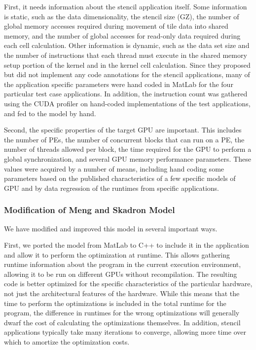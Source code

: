 \documentclass{sig-alternate}
\begin{document}
First, it needs information about the stencil application itself.  Some
information is static, such as the data dimensionality, the stencil size
(GZ), the number of global memory accesses required during movement of tile
data into shared memory, and the number of global accesses for read-only data
required during each cell calculation.  Other information is dynamic, such as
the data set size and the number of instructions that each thread must
execute in the shared memory setup portion of the kernel and in the kernel
cell calculation.  Since they proposed but did not implement any code
annotations for the stencil applications, many of the application specific
parameters were hand coded in MatLab for the four particular test case
applications.  In addition, the instruction count was gathered using the CUDA
profiler on hand-coded implementations of the test applications, and fed to
the model by hand.

Second, the specific properties of the target GPU are important.  This
includes the number of PEs, the number of concurrent blocks that can run on a
PE, the number of threads allowed per block, the time required for the GPU to
perform a global synchronization, and several GPU memory performance
parameters.  These values were acquired by a number of means, including hand
coding some parameters based on the published characteristics of a few
specific models of GPU and by data regression of the runtimes from specific
applications.

\subsubsection{Modification of Meng and Skadron Model}

We have modified and improved this model in several important ways.

First, we ported the model from MatLab to C++ to include it in the
application and allow it to perform the optimization at runtime.  This allows
gathering runtime information about the program in the current execution
environment, allowing it to be run on different GPUs without recompilation.
The resulting code is better optimized for the specific characteristics of
the particular hardware, not just the architectural features of the hardware.
While this means that the time to perform the optimizations is included in
the total runtime for the program, the difference in runtimes for the wrong
optimizations will generally dwarf the cost of calculating the optimizations
themselves.  In addition, stencil applications typically take many iterations
to converge, allowing more time over which to amortize the optimization
costs.
\end{document}
